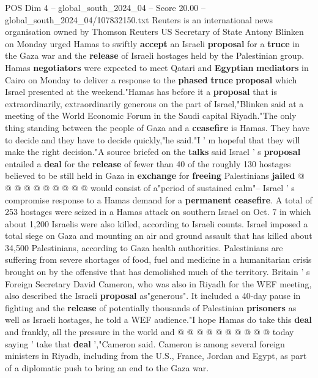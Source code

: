 \begin{textsample}{POS Dim 4 – global\_south\_2024\_04 – Score 20.00 – global\_south\_2024\_04/107832150.txt}  \label{ex:f4_pos_269}
Reuters is an international news organisation owned by Thomson Reuters US Secretary of State Antony Blinken on Monday urged Hamas to swiftly \textbf{accept} an Israeli \textbf{proposal} for a \textbf{truce} in the Gaza war and the \textbf{release} of Israeli hostages held by the Palestinian group.
Hamas \textbf{negotiators} were expected to meet Qatari and \textbf{Egyptian} \textbf{mediators} in Cairo on Monday to deliver a response to the \textbf{phased} \textbf{truce} \textbf{proposal} which Israel presented at the weekend."Hamas has before it a \textbf{proposal} that is extraordinarily, extraordinarily generous on the part of Israel,"Blinken said at a meeting of the World Economic Forum in the Saudi capital Riyadh."The only thing standing between the people of Gaza and a \textbf{ceasefire} is Hamas.
They have to decide and they have to decide quickly,"he said."I ' m hopeful that they will make the right decision."A source briefed on the \textbf{talks} said Israel ' s \textbf{proposal} entailed a \textbf{deal} for the \textbf{release} of fewer than 40 of the roughly 130 hostages believed to be still held in Gaza in \textbf{exchange} for \textbf{freeing} Palestinians \textbf{jailed} @ @ @ @ @ @ @ @ @ @ would consist of a"period of sustained calm"-- Israel ' s compromise response to a Hamas demand for a \textbf{permanent} \textbf{ceasefire}.
A total of 253 hostages were seized in a Hamas attack on southern Israel on Oct. 7 in which about 1,200 Israelis were also killed, according to Israeli counts.
Israel imposed a total siege on Gaza and mounting an air and ground assault that has killed about 34,500 Palestinians, according to Gaza health authorities.
Palestinians are suffering from severe shortages of food, fuel and medicine in a humanitarian crisis brought on by the offensive that has demolished much of the territory.
Britain ' s Foreign Secretary David Cameron, who was also in Riyadh for the WEF meeting, also described the Israeli \textbf{proposal} as"generous".
It included a 40-day pause in fighting and the \textbf{release} of potentially thousands of Palestinian \textbf{prisoners} as well as Israeli hostages, he told a WEF audience."I hope Hamas do take this \textbf{deal} and frankly, all the pressure in the world and @ @ @ @ @ @ @ @ @ @ today saying ' take that \textbf{deal} ',"Cameron said.
Cameron is among several foreign ministers in Riyadh, including from the U.S., France, Jordan and Egypt, as part of a diplomatic push to bring an end to the Gaza war.

\end{textsample}
